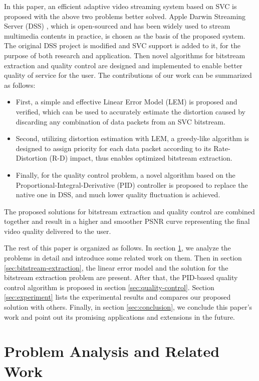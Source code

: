 \documentclass[journal]{IEEEtran}
\begin{document}
In this paper, an efficient adaptive video streaming system based on SVC is proposed with the above two problems better solved. Apple Darwin Streaming Server (DSS) \cite{DSS}, which is open-sourced and has been widely used to stream multimedia contents in practice, is chosen as the basis of the proposed system. The original DSS project is modified and SVC support is added to it, for the purpose of both research and application. Then novel algorithms for bitstream extraction and quality control are designed and implemented to enable better quality of service for the user. The contributions of our work can be summarized as follows:
\begin{itemize}
\item First, a simple and effective Linear Error Model (LEM) is proposed and verified, which can be used to accurately estimate the distortion caused by discarding any combination of data packets from an SVC bitstream.
\item Second, utilizing distortion estimation with LEM, a greedy-like algorithm is designed to assign priority for each data packet according to its Rate-Distortion (R-D) impact, thus enables optimized bitstream extraction.
\item Finally, for the quality control problem, a novel algorithm based on the Proportional-Integral-Derivative (PID) controller is proposed to replace the native one in DSS, and much lower quality fluctuation is achieved.
\end{itemize}

The proposed solutions for bitstream extraction and quality control are combined together and result in a higher and smoother PSNR curve representing the final video quality delivered to the user.

The rest of this paper is organized as follows. In section \ref{sec:analysis}, we analyze the problems in detail and introduce some related work on them. Then in section \ref{sec:bitstream-extraction}, the linear error model and the solution for the bitstream extraction problem are present. After that, the PID-based quality control algorithm is proposed in section \ref{sec:quality-control}. Section \ref{sec:experiment} lists the experimental results and compares our proposed solution with others. Finally, in section \ref{sec:conclusion}, we conclude this paper's work and point out its promising applications and extensions in the future.


\section{Problem Analysis and Related Work}
\label{sec:analysis}
\end{document}
